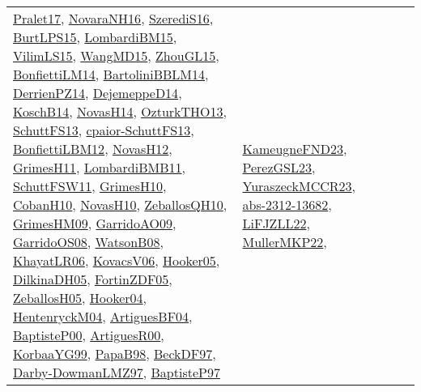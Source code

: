 {\begin{longtable}{lp{3cm}>{\raggedright}p{6cm}>{\raggedright}p{6cm}p{8cm}}
\href{papers/Pralet17.pdf}{Pralet17}\cite{Pralet17}, \href{articles/NovaraNH16.pdf}{NovaraNH16}\cite{NovaraNH16}, \href{papers/SzerediS16.pdf}{SzerediS16}\cite{SzerediS16}, \href{papers/BurtLPS15.pdf}{BurtLPS15}\cite{BurtLPS15}, \href{papers/LombardiBM15.pdf}{LombardiBM15}\cite{LombardiBM15}, \href{papers/VilimLS15.pdf}{VilimLS15}\cite{VilimLS15}, \href{articles/WangMD15.pdf}{WangMD15}\cite{WangMD15}, \href{papers/ZhouGL15.pdf}{ZhouGL15}\cite{ZhouGL15}, \href{papers/BonfiettiLM14.pdf}{BonfiettiLM14}\cite{BonfiettiLM14}, \href{papers/BartoliniBBLM14.pdf}{BartoliniBBLM14}\cite{BartoliniBBLM14}, \href{papers/DerrienPZ14.pdf}{DerrienPZ14}\cite{DerrienPZ14}, \href{papers/DejemeppeD14.pdf}{DejemeppeD14}\cite{DejemeppeD14}, \href{papers/KoschB14.pdf}{KoschB14}\cite{KoschB14}, \href{articles/NovasH14.pdf}{NovasH14}\cite{NovasH14}, \href{articles/OzturkTHO13.pdf}{OzturkTHO13}\cite{OzturkTHO13}, \href{papers/SchuttFS13.pdf}{SchuttFS13}\cite{SchuttFS13}, \href{papers/cpaior-SchuttFS13.pdf}{cpaior-SchuttFS13}\cite{cpaior-SchuttFS13}, \href{papers/BonfiettiLBM12.pdf}{BonfiettiLBM12}\cite{BonfiettiLBM12}, \href{articles/NovasH12.pdf}{NovasH12}\cite{NovasH12}, \href{papers/GrimesH11.pdf}{GrimesH11}\cite{GrimesH11}, \href{papers/LombardiBMB11.pdf}{LombardiBMB11}\cite{LombardiBMB11}, \href{articles/SchuttFSW11.pdf}{SchuttFSW11}\cite{SchuttFSW11}, \href{papers/GrimesH10.pdf}{GrimesH10}\cite{GrimesH10}, \href{papers/CobanH10.pdf}{CobanH10}\cite{CobanH10}, \href{articles/NovasH10.pdf}{NovasH10}\cite{NovasH10}, \href{articles/ZeballosQH10.pdf}{ZeballosQH10}\cite{ZeballosQH10}, \href{papers/GrimesHM09.pdf}{GrimesHM09}\cite{GrimesHM09}, \href{articles/GarridoAO09.pdf}{GarridoAO09}\cite{GarridoAO09}, \href{articles/GarridoOS08.pdf}{GarridoOS08}\cite{GarridoOS08}, \href{papers/WatsonB08.pdf}{WatsonB08}\cite{WatsonB08}, \href{articles/KhayatLR06.pdf}{KhayatLR06}\cite{KhayatLR06}, \href{papers/KovacsV06.pdf}{KovacsV06}\cite{KovacsV06}, \href{articles/Hooker05.pdf}{Hooker05}\cite{Hooker05}, \href{papers/DilkinaDH05.pdf}{DilkinaDH05}\cite{DilkinaDH05}, \href{papers/FortinZDF05.pdf}{FortinZDF05}\cite{FortinZDF05}, \href{articles/ZeballosH05.pdf}{ZeballosH05}\cite{ZeballosH05}, \href{papers/Hooker04.pdf}{Hooker04}\cite{Hooker04}, \href{papers/HentenryckM04.pdf}{HentenryckM04}\cite{HentenryckM04}, \href{papers/ArtiguesBF04.pdf}{ArtiguesBF04}\cite{ArtiguesBF04}, \href{articles/BaptisteP00.pdf}{BaptisteP00}\cite{BaptisteP00}, \href{articles/ArtiguesR00.pdf}{ArtiguesR00}\cite{ArtiguesR00}, \href{papers/KorbaaYG99.pdf}{KorbaaYG99}\cite{KorbaaYG99}, \href{articles/PapaB98.pdf}{PapaB98}\cite{PapaB98}, \href{papers/BeckDF97.pdf}{BeckDF97}\cite{BeckDF97}, \href{articles/Darby-DowmanLMZ97.pdf}{Darby-DowmanLMZ97}\cite{Darby-DowmanLMZ97}, \href{papers/BaptisteP97.pdf}{BaptisteP97}\cite{BaptisteP97} & \href{papers/KameugneFND23.pdf}{KameugneFND23}\cite{KameugneFND23}, \href{papers/PerezGSL23.pdf}{PerezGSL23}\cite{PerezGSL23}, \href{articles/YuraszeckMCCR23.pdf}{YuraszeckMCCR23}\cite{YuraszeckMCCR23}, \href{articles/abs-2312-13682.pdf}{abs-2312-13682}\cite{abs-2312-13682}, \href{papers/LiFJZLL22.pdf}{LiFJZLL22}\cite{LiFJZLL22}, \href{articles/MullerMKP22.pdf}{MullerMKP22}\cite{MullerMKP22}, 
\end{longtable}}
